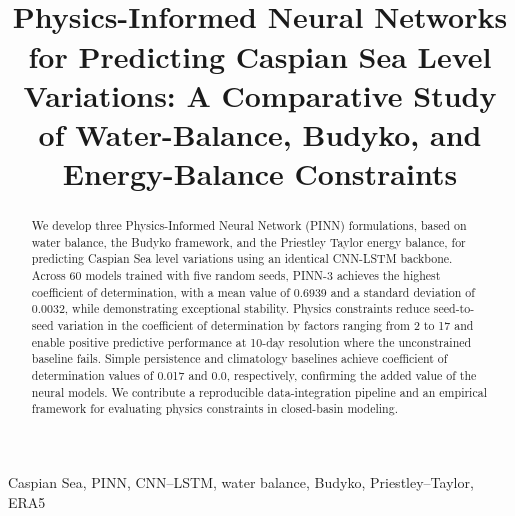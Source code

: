 \documentclass[conference,a4paper]{IEEEtran}
\begin{document}
\title{
\\[1.2em]
\fontsize{20}{24}\selectfont
Physics-Informed Neural Networks for Predicting Caspian Sea Level Variations: A Comparative Study of Water-Balance, Budyko, and Energy-Balance Constraints
}
\author{
}

\maketitle



\begin{abstract}
We develop three Physics-Informed Neural Network (PINN) formulations, based on water balance, the Budyko framework, and the Priestley Taylor energy balance, for predicting Caspian Sea level variations using an identical CNN-LSTM backbone. Across 60 models trained with five random seeds, PINN-3 achieves the highest coefficient of determination, with a mean value of 0.6939 and a standard deviation of 0.0032, while demonstrating exceptional stability. Physics constraints reduce seed-to-seed variation in the coefficient of determination by factors ranging from 2 to 17 and enable positive predictive performance at 10-day resolution where the unconstrained baseline fails. Simple persistence and climatology baselines achieve coefficient of determination values of 0.017 and 0.0, respectively, confirming the added value of the neural models. We contribute a reproducible data-integration pipeline and an empirical framework for evaluating physics constraints in closed-basin modeling.
\end{abstract}

\begin{IEEEkeywords}
Caspian Sea, PINN, CNN--LSTM, water balance, Budyko, Priestley--Taylor, ERA5
\end{IEEEkeywords}
\end{document}
